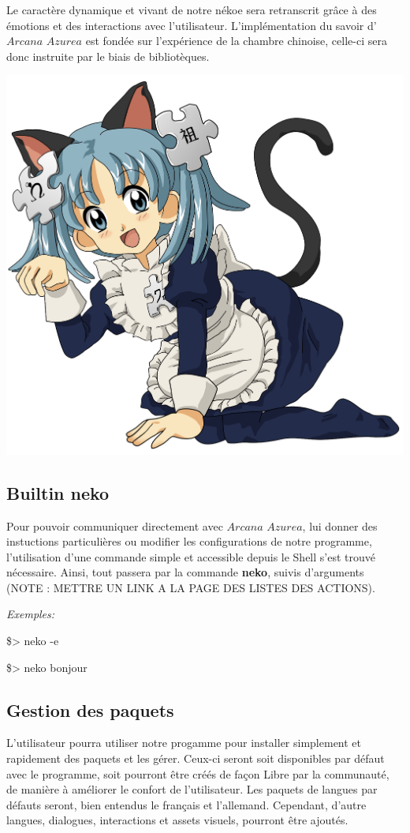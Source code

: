 \documentclass[titlepage]{article}
\newcommand{\name}{\textit{Arcana Azurea}}
\begin{document}
Le caractère dynamique et vivant de notre nékoe sera retranscrit grâce à des émotions et des interactions avec l'utilisateur. L'implémentation du savoir d'$\name$ est fondée sur l'expérience de la chambre chinoise, celle-ci sera donc instruite par le biais de bibliotèques.

\includegraphics[width=1\textwidth]{./1470px-Neko_Wikipe-tan.svg.png}

\newpage
\subsection{Builtin neko}
Pour pouvoir communiquer directement avec $\name$, lui donner des instuctions particulières ou modifier les configurations de notre programme, l'utilisation d'une commande simple et accessible depuis le Shell s'est trouvé nécessaire. Ainsi, tout passera par la commande \textbf{neko}, suivis d'arguments (NOTE : METTRE UN LINK A LA PAGE DES LISTES DES ACTIONS).
{\small\textit{Exemples:}

\$> neko -e

\$> neko bonjour}

\bigskip
\subsection{Gestion des paquets}
L'utilisateur pourra utiliser notre progamme pour installer simplement et rapidement des paquets et les gérer. Ceux-ci seront soit disponibles par défaut avec le programme, soit pourront être créés de façon Libre par la communauté, de manière à améliorer le confort de l'utilisateur.
Les paquets de langues par défauts seront, bien entendus le français et l'allemand. Cependant, d'autre langues, dialogues, interactions et assets visuels, pourront être ajoutés.
\end{document}
